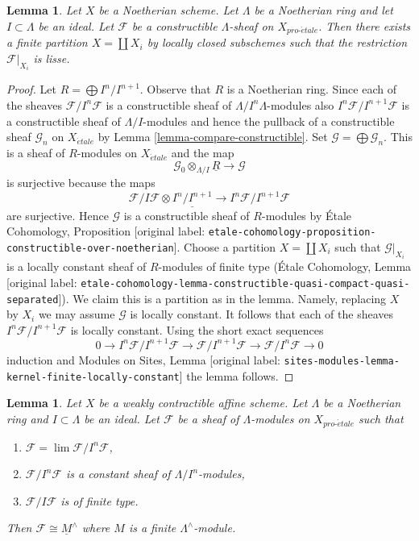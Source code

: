 \documentclass[10pt,a4paper]{article}
\theoremstyle{plain}
\newtheorem{lemma}[subsection]{Lemma}
\theoremstyle{definition}
\theoremstyle{remark}
\numberwithin{equation}{subsection}
\def\lim{\mathop{\mathrm{lim}}\nolimits}
\def\proetale{{pro\text{-}\acute{e}tale}}
\def\etale{{\acute{e}tale}}
\begin{document}
\begin{lemma}
\label{lemma-Noetherian-constructible}
Let $X$ be a Noetherian scheme. Let $\Lambda$ be a Noetherian ring and
let $I \subset \Lambda$ be an ideal. Let $\mathcal{F}$ be a
constructible $\Lambda$-sheaf on $X_\proetale$.
Then there exists a finite partition $X = \coprod X_i$ by
locally closed subschemes such that the restriction $\mathcal{F}|_{X_i}$
is lisse.
\end{lemma}

\begin{proof}
Let $R = \bigoplus I^n/I^{n + 1}$. Observe that $R$ is a Noetherian ring.
Since each of the sheaves
$\mathcal{F}/I^n\mathcal{F}$ is a constructible sheaf of
$\Lambda/I^n\Lambda$-modules also $I^n\mathcal{F}/I^{n + 1}\mathcal{F}$
is a constructible sheaf of $\Lambda/I$-modules and hence the pullback
of a constructible sheaf $\mathcal{G}_n$ on $X_\etale$ by
Lemma \ref{lemma-compare-constructible}.
Set $\mathcal{G} = \bigoplus \mathcal{G}_n$. This is a sheaf
of $R$-modules on $X_\etale$ and the map
$$
\mathcal{G}_0 \otimes_{\Lambda/I} \underline{R}
\longrightarrow
\mathcal{G}
$$
is surjective because the maps
$$
\mathcal{F}/I\mathcal{F} \otimes \underline{I^n/I^{n + 1}} \to
I^n\mathcal{F}/I^{n + 1}\mathcal{F}
$$
are surjective. Hence $\mathcal{G}$ is a constructible sheaf of
$R$-modules by \'Etale Cohomology, Proposition
[original label: \nolinkurl{etale-cohomology-proposition-constructible-over-noetherian}].
Choose a partition $X = \coprod X_i$ such that
$\mathcal{G}|_{X_i}$ is a locally constant sheaf of $R$-modules
of finite type (\'Etale Cohomology, Lemma
[original label: \nolinkurl{etale-cohomology-lemma-constructible-quasi-compact-quasi-separated}]).
We claim this is a partition as in the lemma.
Namely, replacing $X$ by $X_i$ we may assume $\mathcal{G}$ is locally
constant. It follows that each of the sheaves
 $I^n\mathcal{F}/I^{n + 1}\mathcal{F}$
is locally constant. Using the short exact sequences
$$
0 \to I^n\mathcal{F}/I^{n + 1}\mathcal{F} \to
\mathcal{F}/I^{n + 1}\mathcal{F} \to \mathcal{F}/I^n\mathcal{F} \to 0
$$
induction and Modules on Sites, Lemma
[original label: \nolinkurl{sites-modules-lemma-kernel-finite-locally-constant}]
the lemma follows.
\end{proof}

\begin{lemma}
\label{lemma-weird}
Let $X$ be a weakly contractible affine scheme. Let $\Lambda$ be a Noetherian
ring and $I \subset \Lambda$ be an ideal. Let $\mathcal{F}$ be a sheaf of
$\Lambda$-modules on $X_\proetale$ such that
\begin{enumerate}
\item $\mathcal{F} = \lim \mathcal{F}/I^n\mathcal{F}$,
\item $\mathcal{F}/I^n\mathcal{F}$ is a constant sheaf of
$\Lambda/I^n$-modules,
\item $\mathcal{F}/I\mathcal{F}$ is of finite type.
\end{enumerate}
Then $\mathcal{F} \cong \underline{M}^\wedge$ where $M$ is
a finite $\Lambda^\wedge$-module.
\end{lemma}
\end{document}
